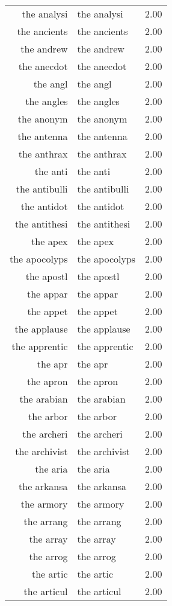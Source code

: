 \begin{table}[ht]
\begin{tabular}{rlr}
  the analysi & the analysi & 2.00 \\ 
  the ancients & the ancients & 2.00 \\ 
  the andrew & the andrew & 2.00 \\ 
  the anecdot & the anecdot & 2.00 \\ 
  the angl & the angl & 2.00 \\ 
  the angles & the angles & 2.00 \\ 
  the anonym & the anonym & 2.00 \\ 
  the antenna & the antenna & 2.00 \\ 
  the anthrax & the anthrax & 2.00 \\ 
  the anti & the anti & 2.00 \\ 
  the antibulli & the antibulli & 2.00 \\ 
  the antidot & the antidot & 2.00 \\ 
  the antithesi & the antithesi & 2.00 \\ 
  the apex & the apex & 2.00 \\ 
  the apocolyps & the apocolyps & 2.00 \\ 
  the apostl & the apostl & 2.00 \\ 
  the appar & the appar & 2.00 \\ 
  the appet & the appet & 2.00 \\ 
  the applause & the applause & 2.00 \\ 
  the apprentic & the apprentic & 2.00 \\ 
  the apr & the apr & 2.00 \\ 
  the apron & the apron & 2.00 \\ 
  the arabian & the arabian & 2.00 \\ 
  the arbor & the arbor & 2.00 \\ 
  the archeri & the archeri & 2.00 \\ 
  the archivist & the archivist & 2.00 \\ 
  the aria & the aria & 2.00 \\ 
  the arkansa & the arkansa & 2.00 \\ 
  the armory & the armory & 2.00 \\ 
  the arrang & the arrang & 2.00 \\ 
  the array & the array & 2.00 \\ 
  the arrog & the arrog & 2.00 \\ 
  the artic & the artic & 2.00 \\ 
  the articul & the articul & 2.00 \\ 

\end{tabular}
\end{table}
